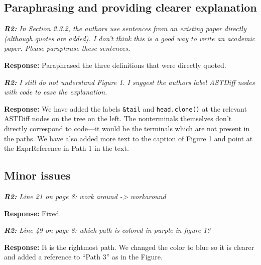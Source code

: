 \documentclass{article}
\begin{document}
\subsection{Paraphrasing and providing clearer explanation}

\textit{\textbf{R2:} In Section 2.3.2, the authors use sentences from an existing paper directly (although quotes are added). I don't think this is a good way to write an academic paper. Please paraphrase these sentences.}

\vspace*{1em} \noindent \textbf{Response:} Paraphrased the three definitions that were directly quoted.

\vspace*{1em} \noindent \textit{\textbf{R2: } I still do not understand Figure 1. I suggest the authors label ASTDiff nodes with code to ease the explanation.}

\vspace*{1em} \noindent \textbf{Response:} We have added the labels {\tt \&tail} and {\tt head.clone()} at the relevant ASTDiff nodes on the tree on the left. The nonterminals themselves don't directly correspond to code---it would be the terminals which are not present in the paths. We have also added more text to the caption of Figure 1 and point at the ExprReference in Path 1 in the text.

\subsection{Minor issues}

\textit{\textbf{R2:} Line 21 on page 8: work around -> workaround}

\vspace*{1em} \noindent \textbf{Response:} Fixed.

\vspace*{1em} \noindent \textit{\textbf{R2:} Line 49 on page 8: which path is colored in purple in figure 1?}

\vspace*{1em} \noindent \textbf{Response:} It is the rightmost path. We changed the color to blue so it is clearer and added a reference to ``Path 3'' as in the Figure.

\small


\end{document}
